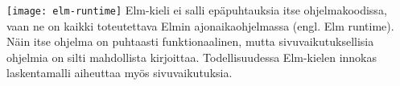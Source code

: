 \texttt{[image: elm-runtime]}
Elm-kieli ei salli epäpuhtauksia itse ohjelmakoodissa, vaan ne on kaikki toteutettava Elmin ajonaikaohjelmassa (engl.
Elm runtime). Näin itse ohjelma on puhtaasti funktionaalinen, mutta sivuvaikutuksellisia ohjelmia on silti mahdollista
kirjoittaa. Todellisuudessa Elm-kielen innokas laskentamalli aiheuttaa myös sivuvaikutuksia. \cite{elmlang}
